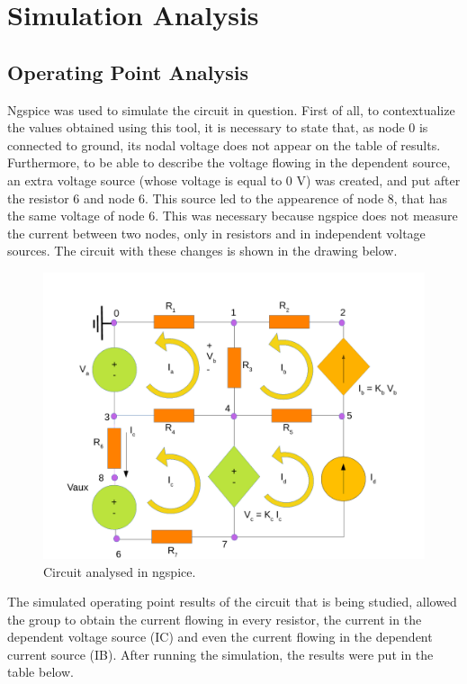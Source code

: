 
\section{Simulation Analysis}
\label{simulation}

\subsection{Operating Point Analysis}

Ngspice was used to simulate the circuit in question. First of all, to contextualize the values obtained using this tool, it is necessary to state that, as node 0 is connected to ground, its nodal voltage does not appear on the table of results. Furthermore, to be able to describe the voltage flowing in the dependent source, an extra voltage source (whose voltage is equal to 0 V) was created, and put after the resistor 6 and node 6. This source led to the appearence of node 8, that has the same voltage of node 6. This was necessary because ngspice does not measure the current between two nodes, only in resistors and in independent voltage sources. The circuit with these changes is shown in the drawing below.

\begin{figure}[ht] \centering
\includegraphics[width=1.0\linewidth]{simdraw.pdf}
\caption{Circuit analysed in ngspice.}
\label{simdraw}
\end{figure}


The simulated operating point results of the circuit that is being studied, allowed the group to obtain the current flowing in every resistor, the current in the dependent voltage source (IC) and even the current flowing in the dependent current source (IB). After running the simulation, the results were put in the table below.


